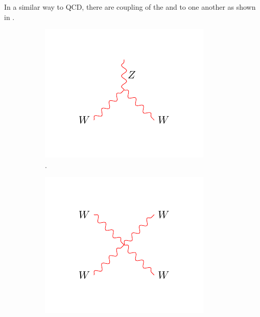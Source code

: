 In a similar way to \ac{QCD}, there are coupling of the \PW and \PZ to one
another as shown in .

\begin{figure}[htbp]
  \centering
  \begin{subfigure}{0.3\textwidth}
    \centering
    \includegraphics[width=\textwidth]{weak_WWZ}
    \caption{\HepProcess{\PW\PW\PZ}.}
    \label{fig:weak_WWZ}
  \end{subfigure}
  \begin{subfigure}{0.3\textwidth}
    \centering
    \includegraphics[width=\textwidth]{weak_WWWW}

\end{subfigure}
\end{figure}
